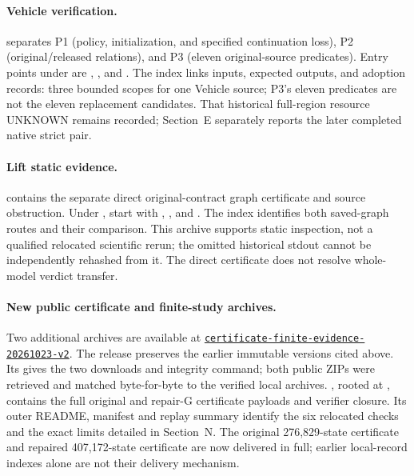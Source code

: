 \paragraph{Vehicle verification.}
 separates P1
(policy, initialization, and specified continuation loss), P2
(original/released relations), and P3 (eleven original-source predicates).
Entry points under 
are , , and
. The index links inputs, expected outputs, and adoption records: three bounded scopes
for one Vehicle source; P3's eleven predicates are not the eleven
replacement candidates. That historical full-region resource UNKNOWN
remains recorded; Section~E separately reports the later completed native
strict pair.

\paragraph{Lift static evidence.}
 contains
the separate direct original-contract graph certificate and source
obstruction. Under , start
with , ,
and . The index identifies both
saved-graph routes and their comparison. This archive supports static
inspection, not a qualified relocated scientific rerun; the omitted
historical stdout cannot be independently rehashed from it. The direct
certificate does not resolve whole-model verdict transfer.

\paragraph{New public certificate and finite-study archives.}
Two additional archives are available at
\href{https://github.com/research-artifact-archive/seams2027/tree/certificate-finite-evidence-20261023-v2}{\nolinkurl{certificate-finite-evidence-20261023-v2}}.
The release preserves the earlier immutable versions cited above.
Its  gives the two downloads and
integrity command; both public ZIPs were retrieved and matched byte-for-byte
to the verified local archives.
, rooted at
, contains the full
original and repair-G certificate payloads and verifier closure.
Its outer README, manifest and replay summary identify the six
relocated checks and the exact limits detailed in Section~N.
The original 276,829-state certificate and repaired 407,172-state
certificate are now delivered in full; earlier local-record indexes
alone are not their delivery mechanism.

